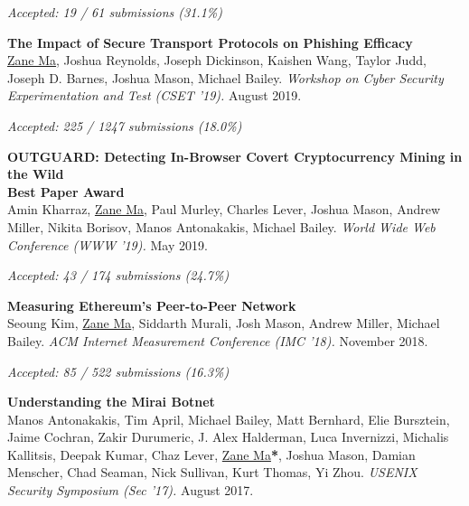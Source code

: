 \documentclass[10pt,singlecolumn]{article} %
\begin{document}
\vspace{6pt}

{\raggedleft\textit{Accepted: 19 / 61 submissions (31.1\%)}\par}

\textbf{The Impact of Secure Transport Protocols on Phishing Efficacy}\\
\underline{Zane Ma}, Joshua Reynolds, Joseph Dickinson, Kaishen Wang, Taylor Judd, Joseph D. Barnes, Joshua Mason, Michael Bailey.
\textit{Workshop on Cyber Security Experimentation and Test (CSET '19).} August 2019.

\vspace{6pt}

{\raggedleft\textit{Accepted: 225 / 1247 submissions (18.0\%)}\par}

\textbf{OUTGUARD: Detecting In-Browser Covert Cryptocurrency Mining in the Wild}\\
    \textbf{\color{headings}Best Paper Award}\\
Amin Kharraz, \underline{Zane Ma}, Paul Murley, Charles Lever, Joshua Mason, Andrew Miller,
Nikita Borisov, Manos Antonakakis, Michael Bailey. 
\textit{World Wide Web Conference (WWW '19).} May 2019.

\vspace{6pt}

{\raggedleft\textit{Accepted: 43 / 174 submissions (24.7\%)}\par}

\textbf{Measuring Ethereum's Peer-to-Peer Network}\\
Seoung Kim, \underline{Zane Ma}, Siddarth Murali, Josh Mason, Andrew Miller, Michael Bailey.
\textit{ACM Internet Measurement Conference (IMC '18).} November 2018.


\vspace{6pt}
{\raggedleft\textit{Accepted: 85 / 522 submissions (16.3\%)}\par}

\textbf{Understanding the Mirai Botnet}\\
Manos Antonakakis, Tim April, Michael Bailey, Matt Bernhard, Elie Bursztein, Jaime Cochran, Zakir Durumeric, J. Alex Halderman, Luca Invernizzi, Michalis Kallitsis, Deepak Kumar, Chaz Lever, \underline{Zane Ma}\textbf{*}, Joshua Mason, Damian Menscher, Chad Seaman, Nick Sullivan, Kurt Thomas, Yi Zhou.
\textit{USENIX Security Symposium (Sec '17).} August 2017.
\end{document}
